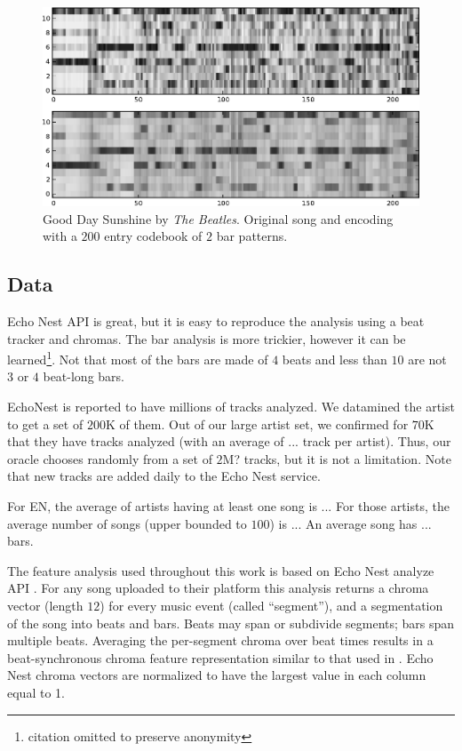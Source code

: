 \documentclass{sig-alternate}
\begin{document}
\begin{figure}[thb]
\begin{center}
\includegraphics[width=.9\columnwidth]{song_encoded}
\end{center}
\caption{\small{Good Day Sunshine by \textit{The Beatles}.
Original song and encoding with a $200$ entry codebook of 
$2$ bar patterns.
}}
\label{fig:encodesong}
\end{figure}

\subsection{Data}
Echo Nest API \cite{EchoNest} is great, but it is easy to reproduce
the analysis using a beat tracker and chromas. The bar analysis is
more trickier, however it can be learned\footnote{citation omitted to preserve 
anonymity}. Not that most of the bars are made of $4$ beats and less
than $10$ are not $3$ or $4$ beat-long bars.

EchoNest is reported to have millions of tracks analyzed. We datamined
the artist to get a set of $200$K of them. Out of our large artist set,
we confirmed for $70$K that they have tracks analyzed (with an average
of ... track per artist). Thus, our oracle chooses randomly from a set of
$2$M? tracks, but it is not a limitation. Note that new tracks are added
daily to the Echo Nest service.

For EN, the average of artists having at least one song is ... For those
artists, the average number of songs (upper bounded to $100$) is ...
An average song has ... bars.


The feature analysis used throughout this work is based on Echo Nest
analyze API \cite{EchoNest}.  
%
For any song uploaded to their platform this analysis returns a chroma
vector (length $12$) for every music event (called ``segment''), and a
segmentation of the song into beats and bars. Beats may span or 
subdivide segments; bars span multiple beats.
%
Averaging the per-segment chroma over beat times results in a
beat-synchronous chroma feature representation similar to that used in
\cite{Ellis2007a}.  Echo Nest chroma vectors are normalized to have the 
largest value in each column equal to 1.
\end{document}
